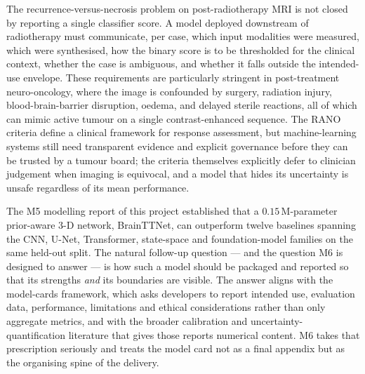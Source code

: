 \documentclass[11pt,a4paper]{article}
\begin{document}
The recurrence-versus-necrosis problem on post-radiotherapy MRI is not closed by reporting a single classifier score. A model deployed downstream of radiotherapy must communicate, per case, which input modalities were measured, which were synthesised, how the binary score is to be thresholded for the clinical context, whether the case is ambiguous, and whether it falls outside the intended-use envelope. These requirements are particularly stringent in post-treatment neuro-oncology, where the image is confounded by surgery, radiation injury, blood-brain-barrier disruption, oedema, and delayed sterile reactions, all of which can mimic active tumour on a single contrast-enhanced sequence. The RANO criteria define a clinical framework for response assessment, but machine-learning systems still need transparent evidence and explicit governance before they can be trusted by a tumour board; the criteria themselves explicitly defer to clinician judgement when imaging is equivocal, and a model that hides its uncertainty is unsafe regardless of its mean performance.

The M5 modelling report of this project established that a $0.15\,\text{M}$-parameter prior-aware 3-D network, BrainTTNet, can outperform twelve baselines spanning the CNN, U-Net, Transformer, state-space and foundation-model families on the same held-out split. The natural follow-up question --- and the question M6 is designed to answer --- is how such a model should be packaged and reported so that its strengths \emph{and} its boundaries are visible. The answer aligns with the model-cards framework, which asks developers to report intended use, evaluation data, performance, limitations and ethical considerations rather than only aggregate metrics, and with the broader calibration and uncertainty-quantification literature that gives those reports numerical content. M6 takes that prescription seriously and treats the model card not as a final appendix but as the organising spine of the delivery.
\end{document}
